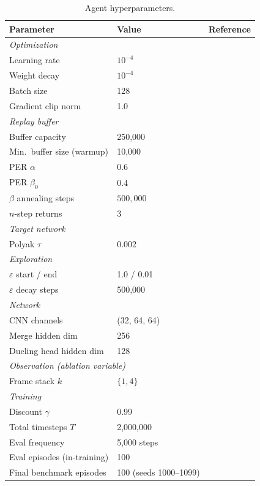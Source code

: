 \documentclass[12pt,a4paper,titlepage]{article}
\begin{document}
\begin{table}[!ht]
\centering
\caption{Agent hyperparameters.}
\label{tab:hyperparams}
\begin{tabular}{lll}
\toprule
Parameter & Value & Reference \\
\midrule
\multicolumn{3}{l}{\textit{Optimization}} \\
Learning rate              & $10^{-4}$         & \\
Weight decay               & $10^{-4}$         & \citet{Loshchilov2019} \\
Batch size                 & 128               & \\
Gradient clip norm         & 1.0               & \\
\midrule
\multicolumn{3}{l}{\textit{Replay buffer}} \\
Buffer capacity            & 250{,}000         & \\
Min.\ buffer size (warmup) & 10{,}000          & \citet{Mnih2015} \\
PER $\alpha$               & 0.6               & \citet{Schaul2016} \\
PER $\beta_0$              & 0.4               & \citet{Schaul2016} \\
$\beta$ annealing steps    & $500{,}000$             & \\
$n$-step returns           & 3                 & \citet{Hessel2018} \\
\midrule
\multicolumn{3}{l}{\textit{Target network}} \\
Polyak $\tau$              & 0.002             & \citet{Lillicrap2016} \\
\midrule
\multicolumn{3}{l}{\textit{Exploration}} \\
$\varepsilon$ start / end  & 1.0 / 0.01        & \citet{Mnih2015} \\
$\varepsilon$ decay steps  & 500{,}000         & \\
\midrule
\multicolumn{3}{l}{\textit{Network}} \\
CNN channels               & (32, 64, 64)      & \\
Merge hidden dim           & 256               & \\
Dueling head hidden dim    & 128               & \\
\midrule
\multicolumn{3}{l}{\textit{Observation (ablation variable)}} \\
Frame stack $k$            & $\{1, 4\}$        & \citet{Mnih2015} \\
\midrule
\multicolumn{3}{l}{\textit{Training}} \\
Discount $\gamma$          & 0.99              & \\
Total timesteps $T$        & 2{,}000{,}000     & \\
Eval frequency             & 5{,}000 steps     & \\
Eval episodes (in-training) & 100               & \\
Final benchmark episodes   & 100 (seeds 1000--1099) & \\
\bottomrule
\end{tabular}
\end{table}
\end{document}

